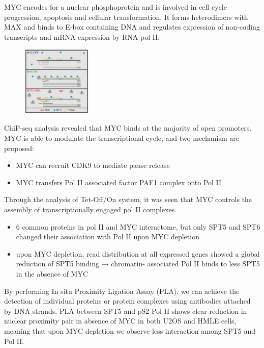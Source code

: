 MYC encodes for a nuclear phosphoprotein and is involved in cell cycle progression, apoptosis and cellular transformation. It forms heterodimers with MAX and binds to E-box containing DNA and regulates expression of non-coding transcripts and mRNA expression by RNA pol II.

\begin{figure}
\centering
\includegraphics[width=0.3\textwidth]{../_resources/Screenshot_2022-10-28_at_10-37-23.png}
\caption{}
\end{figure}

ChiP-seq analysis revealed that MYC binds at the majority of open promoters. MYC is able to modulate the transcriptional cycle, and two mechanism are
proposed:
\begin{itemize}
\tightlist
\item
  MYC can recruit CDK9 to mediate pause release
\item
  MYC transfers Pol II associated factor PAF1 complex onto Pol II
\end{itemize}

Through the analysis of Tet-Off/On system, it was seen that MYC controls the assembly of transcriptionally engaged pol II complexes.
\begin{itemize}
\tightlist
\item
  6 common proteins in pol II and MYC interactome, but only SPT5 and SPT6 changed their association with Pol II upon MYC depletion
\item
  upon MYC depletion, read distribution at all expressed genes showed a
  global reduction of SPT5 binding → chromatin- associated Pol II binds
  to less SPT5 in the absence of MYC
\end{itemize}

By performing In situ Proximity Ligation Assay (PLA), we can achieve the detection of individual proteins or protein complexes using antibodies attached by DNA strands. PLA between SPT5 and pS2-Pol II shows clear reduction in nuclear proximity pair in absence of MYC in both U2OS and HMLE cells, meaning that upon MYC depletion we observe less interaction among SPT5 and Pol II. 

